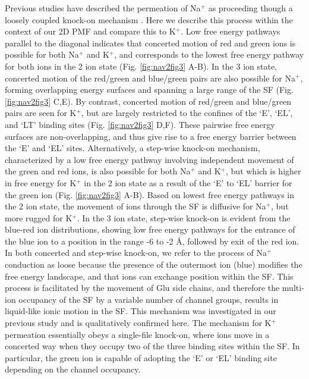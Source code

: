 \begin{refsection}
Previous studies have described the permeation of Na$^+$ as proceeding though a loosely coupled knock-on mechanism \cite{Ing:2016em}. Here we describe this process within the context of our 2D PMF and compare this to K$^+$. Low free energy pathways parallel to the diagonal indicates that concerted motion of red and green ions is possible for both Na$^+$ and K$^+$, and corresponds to the lowest free energy pathway for both ions in the 2 ion state (Fig. \ref{fig:nav2fig3} A-B). In the 3 ion state, concerted motion of the red/green and blue/green pairs are also possible for Na$^+$, forming overlapping energy surfaces and spanning a large range of the SF (Fig. \ref{fig:nav2fig3} C,E). By contrast, concerted motion of red/green and blue/green pairs are seen for K$^+$, but are largely restricted to the confines of the `E', `EL', and `LT' binding sites (Fig. \ref{fig:nav2fig3} D,F). These pairwise free energy surfaces are non-overlapping, and thus give rise to a free energy barrier between the `E' and `EL' sites. Alternatively, a step-wise knock-on mechanism, characterized by a low free energy pathway involving independent movement of the green and red ions, is also possible for both Na$^+$ and K$^+$, but which is higher in free energy for K$^+$ in the 2 ion state as a result of the `E' to `EL' barrier for the green ion (Fig. \ref{fig:nav2fig3} A-B). Based on lowest free energy pathways in the 2 ion state, the movement of ions through the SF is diffusive for Na$^+$, but more rugged for K$^+$. In the 3 ion state, step-wise knock-on is evident from the blue-red ion distributions, showing low free energy pathways for the entrance of the blue ion to a position in the range -6 to -2 \AA, followed by exit of the red ion. In both concerted and step-wise knock-on, we refer to the process of Na$^+$ conduction as loose because the presence of the outermost ion (blue) modifies the free energy landscape, and that ions can exchange position within the SF. This process is facilitated by the movement of Glu side chains, and therefore the multi-ion occupancy of the SF by a variable number of channel groups, results in liquid-like ionic motion in the SF. This mechanism was investigated in our previous study and is qualitatively confirmed here. The mechanism for K$^+$ permeation essentially obeys a single-file knock-on, where ions move in a concerted way when they occupy two of the three binding sites within the SF. In particular, the green ion is capable of adopting the `E' or `EL' binding site depending on the channel occupancy. 


\end{refsection}
